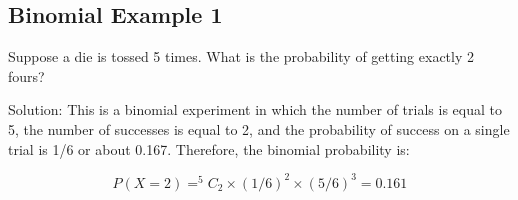 \documentclass[]{report}
\begin{document}
\subsection{ Binomial Example 1}
	
	Suppose a die is tossed 5 times. What is the probability of getting exactly 2 fours?
	
	Solution: This is a binomial experiment in which the number of trials is equal to 5, the number of successes is equal to 2, and the probability of success on a single trial is 1/6 or about 0.167. Therefore, the binomial probability is:
	
	\[P(X=2) = ^5C_2 \times (1/6)^2 \times (5/6)^3 = 0.161\]
\end{document}
